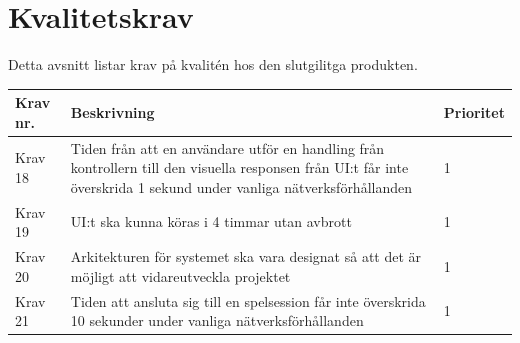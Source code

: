 \documentclass[10pt]{article}
\begin{document}
\section{Kvalitetskrav}
	Detta avsnitt listar krav på kvalitén hos den slutgilitga produkten.
	
		\begin{tabular}{|p{2cm}|p{8cm}|p{2cm}|}
		\hline
		\textbf{Krav nr.} & \textbf{Beskrivning} & \textbf{Prioritet} \\ \hline
		Krav 18 & Tiden från att en användare utför en handling från kontrollern till den visuella responsen från UI:t får inte överskrida 1 sekund under vanliga nätverksförhållanden & 1\\ \hline
		Krav 19 & UI:t ska kunna köras i 4 timmar utan avbrott & 1 \\ \hline
		Krav 20 & Arkitekturen för systemet ska vara designat så att det är möjligt att vidareutveckla projektet & 1 \\ \hline
		Krav 21 & Tiden att ansluta sig till en spelsession får inte överskrida 10 sekunder under vanliga nätverksförhållanden & 1 \\ \hline
		
	\end{tabular}
\end{document}
